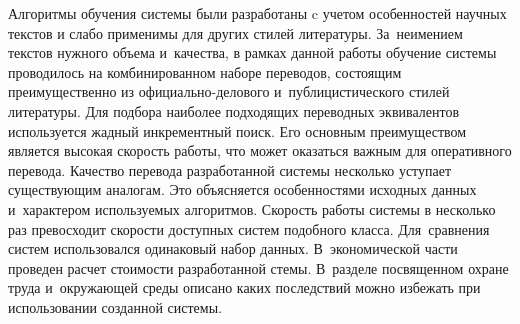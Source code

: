 	Алгоритмы обучения системы были разработаны c учетом 
	особенностей научных текстов
	и слабо применимы для других стилей литературы.
	За~неимением текстов нужного объема и~качества,
	в рамках данной работы обучение системы проводилось
	на комбинированном наборе переводов, состоящим 
	преимущественно
	из официально-делового и~публицистического стилей литературы.
	Для подбора наиболее подходящих переводных эквивалентов
	используется жадный инкрементный поиск.
	Его основным преимуществом является высокая скорость работы,
	что может оказаться важным для оперативного перевода.
	Качество перевода разработанной системы несколько уступает
	существующим аналогам. Это объясняется особенностями
	исходных данных и~характером используемых алгоритмов.
	Скорость работы системы в несколько раз превосходит 
	скорости доступных систем подобного 
	класса. Для~сравнения систем использовался 
	одинаковый набор данных.
	В~экономической части проведен расчет 
	стоимости разработанной стемы.
	В~разделе посвященном 
	охране труда и~окружающей среды описано 
	каких последствий можно избежать 
	при использовании созданной системы.

\pagebreak

